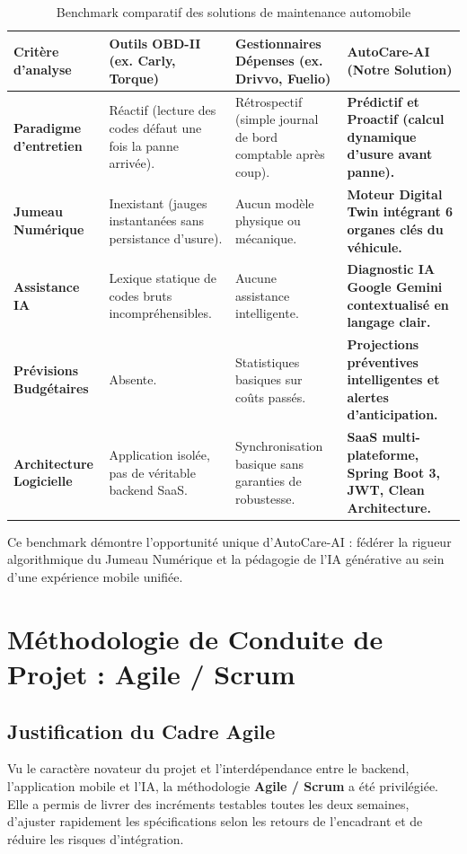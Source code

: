\documentclass[12pt,a4paper,oneside]{report}
\begin{document}
\begin{table}[H]
\centering
\small
\begin{tabularx}{\textwidth}{p{3.2cm} X X X}
\toprule
\textbf{Crit\`ere d'analyse} & \textbf{Outils OBD-II (ex. Carly, Torque)} & \textbf{Gestionnaires D\'epenses (ex. Drivvo, Fuelio)} & \textbf{AutoCare-AI (Notre Solution)} \\
\midrule
\textbf{Paradigme d'entretien} & R\'eactif (lecture des codes d\'efaut une fois la panne arriv\'ee). & R\'etrospectif (simple journal de bord comptable apr\`es coup). & \textbf{Pr\'edictif et Proactif (calcul dynamique d'usure avant panne).} \\
\addlinespace
\textbf{Jumeau Num\'erique} & Inexistant (jauges instantan\'ees sans persistance d'usure). & Aucun mod\`ele physique ou m\'ecanique. & \textbf{Moteur Digital Twin int\'egrant 6 organes cl\'es du v\'ehicule.} \\
\addlinespace
\textbf{Assistance IA} & Lexique statique de codes bruts incompr\'ehensibles. & Aucune assistance intelligente. & \textbf{Diagnostic IA Google Gemini contextualis\'e en langage clair.} \\
\addlinespace
\textbf{Pr\'evisions Budg\'etaires} & Absente. & Statistiques basiques sur co\^uts pass\'es. & \textbf{Projections pr\'eventives intelligentes et alertes d'anticipation.} \\
\addlinespace
\textbf{Architecture Logicielle} & Application isol\'ee, pas de v\'eritable backend SaaS. & Synchronisation basique sans garanties de robustesse. & \textbf{SaaS multi-plateforme, Spring Boot 3, JWT, Clean Architecture.} \\
\bottomrule
\end{tabularx}
\caption{Benchmark comparatif des solutions de maintenance automobile}
\label{tab:benchmark}
\end{table}

Ce benchmark d\'emontre l'opportunit\'e unique d'AutoCare-AI : f\'ed\'erer la rigueur algorithmique du Jumeau Num\'erique et la p\'edagogie de l'IA g\'en\'erative au sein d'une exp\'erience mobile unifi\'ee.

\section{M\'ethodologie de Conduite de Projet : Agile / Scrum}

\subsection{Justification du Cadre Agile}
Vu le caract\`ere novateur du projet et l'interd\'ependance entre le backend, l'application mobile et l'IA, la m\'ethodologie \textbf{Agile / Scrum} a \'et\'e privil\'egi\'ee. Elle a permis de livrer des incr\'ements testables toutes les deux semaines, d'ajuster rapidement les sp\'ecifications selon les retours de l'encadrant et de r\'eduire les risques d'int\'egration.
\end{document}
